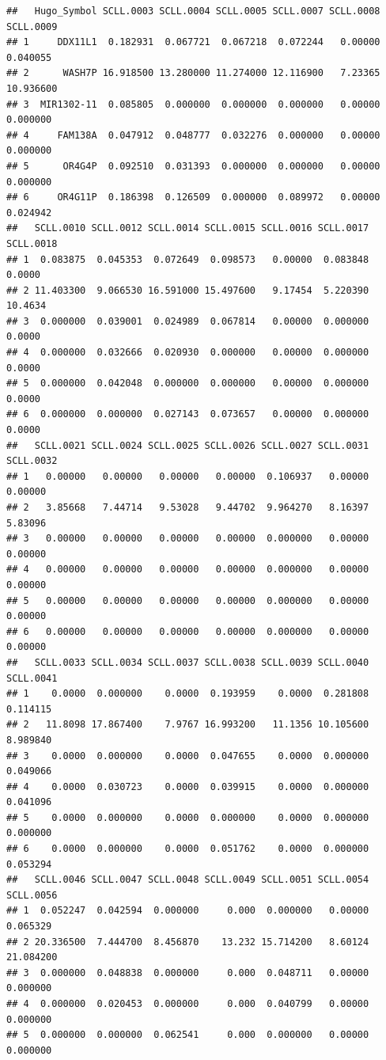 \documentclass[
]{article}
\begin{document}
\begin{verbatim}
##   Hugo_Symbol SCLL.0003 SCLL.0004 SCLL.0005 SCLL.0007 SCLL.0008 SCLL.0009
## 1     DDX11L1  0.182931  0.067721  0.067218  0.072244   0.00000  0.040055
## 2      WASH7P 16.918500 13.280000 11.274000 12.116900   7.23365 10.936600
## 3  MIR1302-11  0.085805  0.000000  0.000000  0.000000   0.00000  0.000000
## 4     FAM138A  0.047912  0.048777  0.032276  0.000000   0.00000  0.000000
## 5      OR4G4P  0.092510  0.031393  0.000000  0.000000   0.00000  0.000000
## 6     OR4G11P  0.186398  0.126509  0.000000  0.089972   0.00000  0.024942
##   SCLL.0010 SCLL.0012 SCLL.0014 SCLL.0015 SCLL.0016 SCLL.0017 SCLL.0018
## 1  0.083875  0.045353  0.072649  0.098573   0.00000  0.083848    0.0000
## 2 11.403300  9.066530 16.591000 15.497600   9.17454  5.220390   10.4634
## 3  0.000000  0.039001  0.024989  0.067814   0.00000  0.000000    0.0000
## 4  0.000000  0.032666  0.020930  0.000000   0.00000  0.000000    0.0000
## 5  0.000000  0.042048  0.000000  0.000000   0.00000  0.000000    0.0000
## 6  0.000000  0.000000  0.027143  0.073657   0.00000  0.000000    0.0000
##   SCLL.0021 SCLL.0024 SCLL.0025 SCLL.0026 SCLL.0027 SCLL.0031 SCLL.0032
## 1   0.00000   0.00000   0.00000   0.00000  0.106937   0.00000   0.00000
## 2   3.85668   7.44714   9.53028   9.44702  9.964270   8.16397   5.83096
## 3   0.00000   0.00000   0.00000   0.00000  0.000000   0.00000   0.00000
## 4   0.00000   0.00000   0.00000   0.00000  0.000000   0.00000   0.00000
## 5   0.00000   0.00000   0.00000   0.00000  0.000000   0.00000   0.00000
## 6   0.00000   0.00000   0.00000   0.00000  0.000000   0.00000   0.00000
##   SCLL.0033 SCLL.0034 SCLL.0037 SCLL.0038 SCLL.0039 SCLL.0040 SCLL.0041
## 1    0.0000  0.000000    0.0000  0.193959    0.0000  0.281808  0.114115
## 2   11.8098 17.867400    7.9767 16.993200   11.1356 10.105600  8.989840
## 3    0.0000  0.000000    0.0000  0.047655    0.0000  0.000000  0.049066
## 4    0.0000  0.030723    0.0000  0.039915    0.0000  0.000000  0.041096
## 5    0.0000  0.000000    0.0000  0.000000    0.0000  0.000000  0.000000
## 6    0.0000  0.000000    0.0000  0.051762    0.0000  0.000000  0.053294
##   SCLL.0046 SCLL.0047 SCLL.0048 SCLL.0049 SCLL.0051 SCLL.0054 SCLL.0056
## 1  0.052247  0.042594  0.000000     0.000  0.000000   0.00000  0.065329
## 2 20.336500  7.444700  8.456870    13.232 15.714200   8.60124 21.084200
## 3  0.000000  0.048838  0.000000     0.000  0.048711   0.00000  0.000000
## 4  0.000000  0.020453  0.000000     0.000  0.040799   0.00000  0.000000
## 5  0.000000  0.000000  0.062541     0.000  0.000000   0.00000  0.000000

\end{verbatim}
\end{document}
